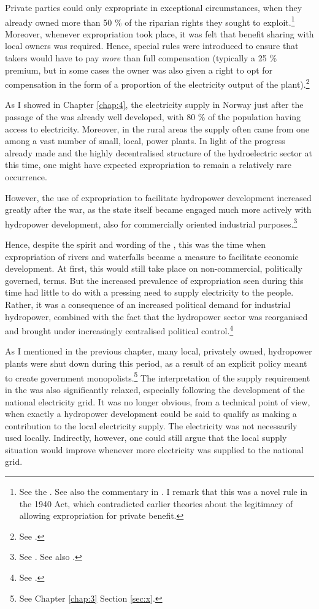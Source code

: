 Private parties could only expropriate in exceptional circumstances, when they already owned more than 50 \% of the riparian rights they sought to exploit.\footnote{See the \cite[55]{wra40}. See also the commentary in \cite[70-74]{sorensen41}. I remark that this was a novel rule in the 1940 Act, which contradicted earlier theories about the legitimacy of allowing expropriation for private benefit.} Moreover, whenever expropriation took place, it was felt that benefit sharing with local owners was required. Hence, special rules were introduced to ensure that takers would have to pay {\it more} than full compensation (typically a 25 \% premium, but in some cases the owner was also given a right to opt for compensation in the form of a proportion of the electricity output of the plant).\footnote{See \cite[70-91,184,210]{sorensen41}.}

As I showed in Chapter \ref{chap:4}, the electricity supply in Norway just after the passage of the \cite{wra40} was already well developed, with 80 \% of the population having access to electricity. Moreover, in the rural areas the supply often came from one among a vast number of small, local, power plants. In light of the progress already made and the highly decentralised structure of the hydroelectric sector at this time, one might have expected expropriation to remain a relatively rare occurrence.

However, the use of expropriation to facilitate hydropower development increased greatly after the war, as the state itself became engaged much more actively with hydropower development, also for commercially oriented industrial purposes.\footnote{See \cite[59-71]{thue96}. See also \cite{skjold06}.}

Hence, despite the spirit and wording of the \cite{wra40}, this was the time when expropriation of rivers and waterfalls became a measure to facilitate economic development. At first, this would still take place on non-commercial, politically governed, terms. But the increased prevalence of expropriation seen during this time had little to do with a pressing need to supply electricity to the people. Rather, it was a consequence of an increased political demand for industrial hydropower, combined with the fact that the hydropower sector was reorganised and brought under increasingly centralised political control.\footnote{See \cite[69-71]{thue96}.}

As I mentioned in the previous chapter, many local, privately owned, hydropower plants were shut down during this period, as a result of an explicit policy meant to create government monopolists.\footnote{See Chapter \ref{chap:3} Section \ref{sec:x}.} The interpretation of the supply requirement in the \cite{wra40} was also significantly relaxed, especially following the development of the national electricity grid. It was no longer obvious, from a technical point of view, when exactly a hydropower development could be said to qualify as making a contribution to the local electricity supply. The electricity was not necessarily used locally. Indirectly, however, one could still argue that the local supply situation would improve whenever more electricity was supplied to the national grid.

